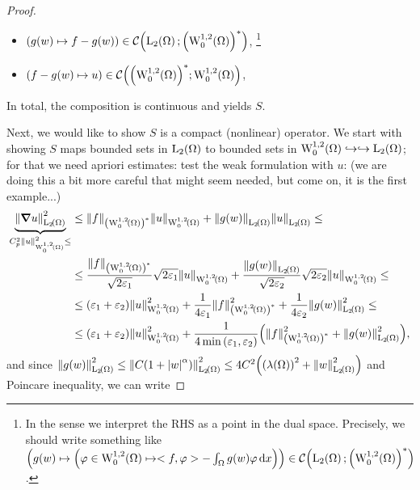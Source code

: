 \documentclass{article}
\begin{document}
\begin{example}
\begin{proof}
\begin{itemize}
			\item $\qty(g(w) \mapsto f - g(w))  \in \mathcal{C}\qty(\LpSet[2]{\Omega}; \qty(\WkpzeroSet[1][2]{\Omega})^{*})$, \footnote{In the sense we interpret the RHS as a point in the dual space. Precisely, we should write something like $\qty(g(w) \mapsto \qty(\varphi \in \WkpzeroSet[1][2]{\Omega} \mapsto <f,\varphi>-\int_{\Omega}g(w) \varphi\dd{x})) \in \mathcal{C}\qty(\LpSet[2]{\Omega}; \qty(\WkpzeroSet[1][2]{\Omega})^{*})$.} 
			\item $\qty(f - g(w) \mapsto u) \in \mathcal{C}\qty(\qty(\WkpzeroSet[1][2]{\Omega})^{*}; \WkpzeroSet[1][2]{\Omega})$, 
		\end{itemize}
		In total, the composition is continuous and yields $S$.

		Next, we would like to show $S$ is a compact (nonlinear) operator. We start with showing $S$ maps bounded sets in $\LpSet[2]{\Omega}$ to bounded sets in $\WkpzeroSet[1][2]{\Omega} \hookrightarrow \hookrightarrow \LpSet[2]{\Omega}$; for that we need apriori estimates: test the weak formulation with $u$: (we are doing this a bit more careful that might seem needed, but come on, it is the first example...)
\begin{align*}
	\underbrace{\norm{\grad u}_{\LpSet[2]{\Omega}}^{2}}_{C_p^{2} \norm{u}_{\WkpzeroSet[1][2]{\Omega}}^{2} \leq} &\leq\norm{f}_{\qty(\WkpzeroSet[1][2]{\Omega})^{*}}\norm{u}_{\WkpzeroSet[1][2]{\Omega}} + \norm{g(w)}_{\LpSet[2]{\Omega}} \norm{u}_{\LpSet[2]{\Omega}}\leq \\
														    &\leq \frac{\norm{f}_{\qty(\WkpzeroSet[1][2]{\Omega})^{*}}}{\sqrt{2 \varepsilon_1}}\sqrt{2 \varepsilon_1}\norm{u}_{\WkpzeroSet[1][2]{\Omega}} + \frac{\norm{g(w)}_{\LpSet[2]{\Omega}}}{\sqrt{2 \varepsilon_2}} \sqrt{2 \varepsilon_2}\norm{u}_{\WkpzeroSet[1][2]{\Omega}}\leq   \\
														    &\leq \qty(\varepsilon_1 + \varepsilon_2)\norm{u}_{\WkpzeroSet[1][2]{\Omega}}^{2} + \frac{1}{4 \varepsilon_1} \norm{f}_{\qty(\WkpzeroSet[1][2]{\Omega})^{*}}^{2} + \frac{1}{4 \varepsilon_2} \norm{g(w)}_{\LpSet[2]{\Omega}}^{2} \leq \\
														    &\leq \qty(\varepsilon_1 + \varepsilon_2)\norm{u}_{\WkpzeroSet[1][2]{\Omega}}^{2}+ \frac{1}{4\min\qty(\varepsilon_1, \varepsilon_2)}\qty(\norm{f}_{\qty(\WkpzeroSet[1][2]{\Omega})^{*}}^{2}+ \norm{g(w)}_{\LpSet[2]{\Omega}}^{2}),
\end{align*}
and since $\norm{g(w)}_{\LpSet[2]{\Omega}}^{2} \leq \norm{C\qty(1+\abs{w}^{\alpha})}_{\LpSet[2]{\Omega}}^{2} \leq 4C^{2}\qty(\qty(\lambda\qty(\Omega))^{2}+\norm{w}_{\LpSet[2]{\Omega}}^{2}) $ and Poincare inequality, we can write

\end{proof}
\end{example}
\end{document}

